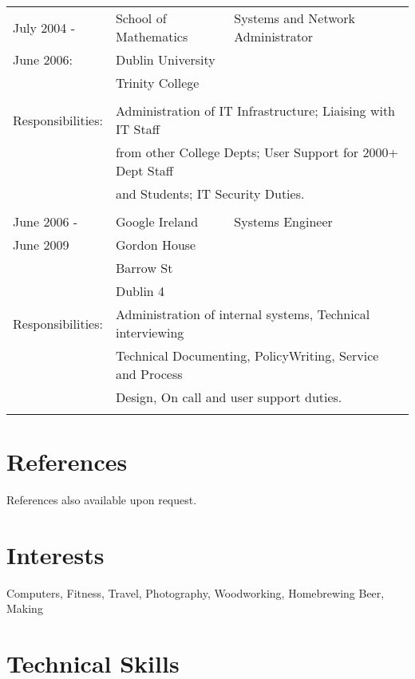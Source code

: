 \documentclass[a4paper, 11pt] {article}
\begin{document}
\begin{tabular}{llll}
July 2004 -			& 	School of Mathematics	&	Systems and Network Administrator &	\\
June 2006:			& 	Dublin University			&	&	\\
						& 	Trinity College			&	&	\\
						& 									&	&	\\
Responsibilities:	& \multicolumn{3}{l}{Administration of IT Infrastructure; Liaising with IT Staff}	\\ 
						& \multicolumn{3}{l}{from other College Depts; User Support for 2000+ Dept Staff}	\\
						& \multicolumn{3}{l}{and Students; IT Security Duties.} 	\\
						& 									&	&	\\
June 2006 - 		&	Google Ireland	&	 Systems Engineer		&	\hspace{10mm}	\\
June 2009  			&	Gordon House	&              &            			\\
      				&	Barrow St		&              &            			\\
      				&	Dublin 4			&              &            			\\
Responsibilities:	& \multicolumn{3}{l}{Administration of internal systems, Technical interviewing} 	\\
						& \multicolumn{3}{l}{Technical Documenting, PolicyWriting, Service and Process}		\\ 
						& \multicolumn{3}{l}{Design, On call and user support duties.} 	\\
      				&              						&  &	\\
\end{tabular}

\section*{References}

References also available upon request.

\section*{Interests}

Computers, Fitness, Travel, Photography, Woodworking, Homebrewing Beer, Making

\section*{Technical Skills}
\end{document}
